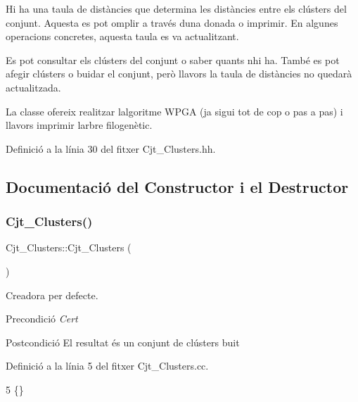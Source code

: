 Hi ha una taula de distàncies que determina les distàncies entre els clústers del conjunt. Aquesta es pot omplir a través d\textquotesingle{}una donada o imprimir. En algunes operacions concretes, aquesta taula es va actualitzant.

Es pot consultar els clústers del conjunt o saber quants n\textquotesingle{}hi ha. També es pot afegir clústers o buidar el conjunt, però llavors la taula de distàncies no quedarà actualitzada.

La classe ofereix realitzar l\textquotesingle{}algoritme W\+P\+GA (ja sigui tot de cop o pas a pas) i llavors imprimir l\textquotesingle{}arbre filogenètic. 

Definició a la línia 30 del fitxer Cjt\+\_\+\+Clusters.\+hh.



\subsection{Documentació del Constructor i el Destructor}
\mbox{\label{class_cjt___clusters_a2e55759944a78043744103e19dd87c1c}} 
\subsubsection{\texorpdfstring{Cjt\+\_\+\+Clusters()}{Cjt\_Clusters()}}
{\footnotesize\ttfamily Cjt\+\_\+\+Clusters\+::\+Cjt\+\_\+\+Clusters (\begin{DoxyParamCaption}{ }\end{DoxyParamCaption})}



Creadora per defecte. 

\begin{DoxyPrecond}{Precondició}
{\itshape Cert} 
\end{DoxyPrecond}
\begin{DoxyPostcond}{Postcondició}
El resultat és un conjunt de clústers buit 
\end{DoxyPostcond}


Definició a la línia 5 del fitxer Cjt\+\_\+\+Clusters.\+cc.


\begin{DoxyCode}
5 \{\}
\end{DoxyCode}
\mbox{\label{class_cjt___clusters_a71b7feadb377225edecc0b980a8c18d6}} 
